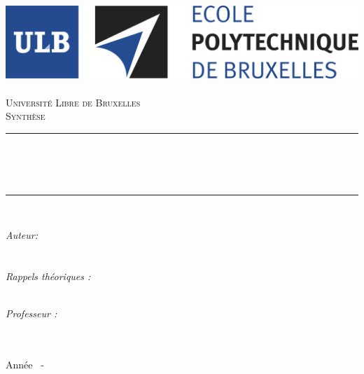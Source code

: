\AddToShipoutPicture*{\BackgroundPic}

\begin{titlepage}
	\begin{center}	
			
		\newcommand{\HRule}{\rule{\linewidth}{0.5mm}}   			            %
		\includegraphics[scale=0.5]{../../Builder/titlepage/logo.jpg}~\\[1cm]				%
			
			\textsc{\LARGE Université Libre de Bruxelles}\\[1.5cm]
			\textsc{\Large Synthèse}\\[0.5cm]
			
			\HRule \\[0.4cm]
			{ \huge \bfseries \cours \ \\\memo \\[0.4cm] }
			
			
			\HRule \\[1.5cm]
			\begin{minipage}{0.6\textwidth}
				\begin{flushleft}%
					\emph{Auteur:}\\
					\mbox{\prenom~\textsc{\nom}}\\
					\ifdefined\rappeltheonom
					\ \\
					\emph{Rappels théoriques :}\\
					\mbox{\rappeltheoprenom~\textsc{\rappeltheonom}}
					\fi
				\end{flushleft}
			\end{minipage}
			\begin{minipage}{0.25\textwidth}
				\emph{Professeur :}\\
				\mbox{\pprenom~\textsc{\pnom}}
				\ifdefined\spprenom
				\\ \mbox{\spprenom~\textsc{\spnom}} \\
				\fi
			\end{minipage}
			
			\vfill
			
			{\large Année \adebut~-~\afin}
			
		\end{center}
	\end{titlepage}